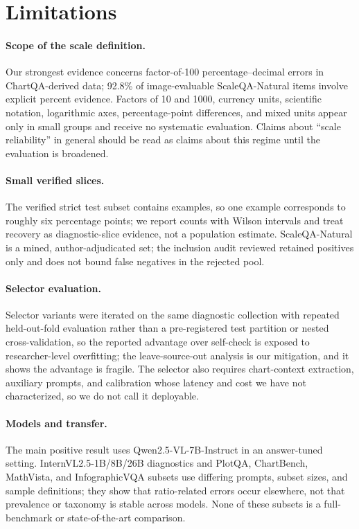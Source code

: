\section*{Limitations}

\paragraph{Scope of the scale definition.}
Our strongest evidence concerns factor-of-100 percentage--decimal errors in ChartQA-derived data; 92.8\% of image-evaluable ScaleQA-Natural items involve explicit percent evidence. Factors of 10 and 1000, currency units, scientific notation, logarithmic axes, percentage-point differences, and mixed units appear only in small groups and receive no systematic evaluation. Claims about ``scale reliability'' in general should be read as claims about this regime until the evaluation is broadened.

\paragraph{Small verified slices.}
The verified strict test subset contains  examples, so one example corresponds to roughly six percentage points; we report counts with Wilson intervals and treat recovery as diagnostic-slice evidence, not a population estimate. ScaleQA-Natural is a mined, author-adjudicated set; the inclusion audit reviewed retained positives only and does not bound false negatives in the rejected pool.

\paragraph{Selector evaluation.}
Selector variants were iterated on the same diagnostic collection with repeated held-out-fold evaluation rather than a pre-registered test partition or nested cross-validation, so the reported advantage over self-check is exposed to researcher-level overfitting; the leave-source-out analysis is our mitigation, and it shows the advantage is fragile. The selector also requires chart-context extraction, auxiliary prompts, and calibration whose latency and cost we have not characterized, so we do not call it deployable.

\paragraph{Models and transfer.}
The main positive result uses Qwen2.5-VL-7B-Instruct in an answer-tuned setting. InternVL2.5-1B/8B/26B diagnostics and PlotQA, ChartBench, MathVista, and InfographicVQA subsets use differing prompts, subset sizes, and sample definitions; they show that ratio-related errors occur elsewhere, not that prevalence or taxonomy is stable across models. None of these subsets is a full-benchmark or state-of-the-art comparison.

